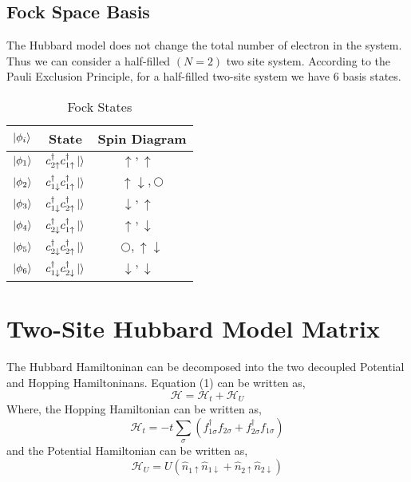 \documentclass{article}
\begin{document}
\subsection{Fock Space Basis}
The Hubbard model does not change the total number of electron in the system. Thus we can consider
a half-filled $(N = 2)$ two site system. According to the Pauli Exclusion Principle, for a half-filled two-site system we
have 6 basis states.
\begin{table}[h]
\begin{center}
  \caption{Fock States}
  \label{tab: Title}
  \begin{tabular} {| lcc |}
      \hline
      $ \ket{\phi_{i}}$ & State & Spin Diagram \\ \hline
      $ \ket{\phi_{1}}$ & $c^{\dagger}_{2\uparrow}c^{\dagger}_{1\uparrow}\ket{} $   &   $ \uparrow ,\uparrow\text{\ } $\\    \hline
      $ \ket{\phi_{2}}$ & $c^{\dagger}_{1\downarrow}c^{\dagger}_{1\uparrow}\ket{} $ &   $  \uparrow\downarrow,\bigcirc $\\   \hline
      $ \ket{\phi_{3}}$ & $c^{\dagger}_{1\downarrow}c^{\dagger}_{2\uparrow}\ket{} $ &   $ \downarrow ,\uparrow \text{\ }$\\  \hline
      $ \ket{\phi_{4}}$ & $c^{\dagger}_{2\downarrow}c^{\dagger}_{1\uparrow}\ket{} $ &   $ \uparrow ,\downarrow \text{\ }$\\  \hline
      $ \ket{\phi_{5}}$ & $c^{\dagger}_{2\downarrow}c^{\dagger}_{2\uparrow}\ket{} $ &   $ \bigcirc,\uparrow\downarrow $\\    \hline
      $ \ket{\phi_{6}}$ & $c^{\dagger}_{1\downarrow}c^{\dagger}_{2\downarrow}\ket{} $ & $ \downarrow,\downarrow\text{\ } $\\ \hline
      \bottomrule
  \end{tabular}

\end{center}
\end{table}
\section{Two-Site Hubbard Model Matrix}
The Hubbard Hamiltoninan can be decomposed into the two decoupled Potential and Hopping Hamiltoninans.
Equation (1) can be written as,
\begin{equation}
\mathcal{H} = \mathcal{H}_t + \mathcal{H}_U
\end{equation}
Where, the Hopping Hamiltonian can be written as,
\begin{equation}
  \mathcal{H}_t = -t\sum_{\sigma} \left(f_{1 \sigma} ^{\dagger}f_{2 \sigma}+f_{2 \sigma} ^{\dagger}f_{1 \sigma} \right)
\end{equation}
and the Potential Hamiltonian can be written as,
\begin{equation}
  \mathcal{H}_U = U\left(\hat{n}_{1\uparrow} \hat{n}_{1\downarrow} + \hat{n}_{2\uparrow} \hat{n}_{2\downarrow} \right)
\end{equation}
\end{document}
